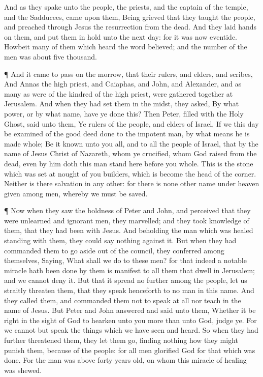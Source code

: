  And as they spake unto the people, the priests, and the
captain of the temple, and the Sadducees, came upon them, 
Being grieved that they taught the people, and preached through Jesus
the resurrection from the dead.  And they laid hands on
them, and put them in hold unto the next day: for it was now eventide.
 Howbeit many of them which heard the word believed; and the
number of the men was about five thousand.

 ¶ And it came to pass on the morrow, that their rulers, and
elders, and scribes,  And Annas the high priest, and
Caiaphas, and John, and Alexander, and as many as were of the kindred of
the high priest, were gathered together at Jerusalem.  And
when they had set them in the midst, they asked, By what power, or by
what name, have ye done this?  Then Peter, filled with the
Holy Ghost, said unto them, Ye rulers of the people, and elders of
Israel,  If we this day be examined of the good deed done to
the impotent man, by what means he is made whole;  Be it
known unto you all, and to all the people of Israel, that by the name of
Jesus Christ of Nazareth, whom ye crucified, whom God raised from the
dead, even by him doth this man stand here before you whole.
 This is the stone which was set at nought of you builders,
which is become the head of the corner.  Neither is there
salvation in any other: for there is none other name under heaven given
among men, whereby we must be saved.

 ¶ Now when they saw the boldness of Peter and John, and
perceived that they were unlearned and ignorant men, they marvelled; and
they took knowledge of them, that they had been with Jesus.
 And beholding the man which was healed standing with them,
they could say nothing against it.  But when they had
commanded them to go aside out of the council, they conferred among
themselves,  Saying, What shall we do to these men? for
that indeed a notable miracle hath been done by them is manifest to all
them that dwell in Jerusalem; and we cannot deny it.  But
that it spread no further among the people, let us straitly threaten
them, that they speak henceforth to no man in this name. 
And they called them, and commanded them not to speak at all nor teach
in the name of Jesus.  But Peter and John answered and said
unto them, Whether it be right in the sight of God to hearken unto you
more than unto God, judge ye.  For we cannot but speak the
things which we have seen and heard.  So when they had
further threatened them, they let them go, finding nothing how they
might punish them, because of the people: for all men glorified God for
that which was done.  For the man was above forty years
old, on whom this miracle of healing was shewed.


